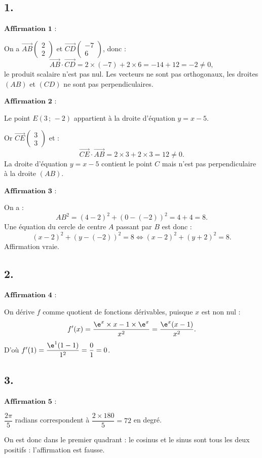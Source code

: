 \subsection*{1.}

\(\textbf{Affirmation 1 :}\)

On a \( \overrightarrow{AB} \begin{pmatrix} 2 \\ 2 \end{pmatrix} \) et \( \overrightarrow{CD} \begin{pmatrix} -7 \\ 6 \end{pmatrix} \), donc :
\[
\overrightarrow{AB} \cdot \overrightarrow{CD} = 2 \times (-7) + 2 \times 6 = -14 + 12 = -2 \neq 0,
\]
le produit scalaire n'est pas nul. Les vecteurs ne sont pas orthogonaux, les droites \((AB)\) et \((CD)\) ne sont pas perpendiculaires.

\(\textbf{Affirmation 2 :}\)

Le point \(E(3 \,;\, -2)\) appartient à la droite d'équation \(y = x - 5\).

Or \( \overrightarrow{CE} \begin{pmatrix} 3 \\ 3 \end{pmatrix} \) et :
\[
\overrightarrow{CE} \cdot \overrightarrow{AB} = 2 \times 3 + 2 \times 3 = 12 \neq 0.
\]
La droite d'équation \(y = x - 5\) contient le point \(C\) mais n'est pas perpendiculaire à la droite \((AB)\).

\(\textbf{Affirmation 3 :}\)

On a :
\[
AB^2 = (4 - 2)^2 + (0 - (-2))^2 = 4 + 4 = 8.
\]
Une équation du cercle de centre \(A\) passant par \(B\) est donc :
\[
(x - 2)^2 + (y - (-2))^2 = 8 \iff (x - 2)^2 + (y + 2)^2 = 8.
\]
Affirmation vraie.

\subsection*{2.}

\(\textbf{Affirmation 4 :}\)

On dérive \(f\) comme quotient de fonctions dérivables, puisque \(x\) est non nul :
\[
f'(x) = \dfrac{\e^x \times x - 1 \times \e^x}{x^2} = \dfrac{\e^x (x - 1)}{x^2}.
\]
D'où \(f'(1) = \dfrac{\e^1 (1 - 1)}{1^2} = \dfrac{0}{1} = 0\).

\subsection*{3.}

\(\textbf{Affirmation 5 :}\)

\(\dfrac{2\pi}{5}\) radians correspondent à \(\dfrac{2 \times 180}{5} = 72\) en degré.

On est donc dans le premier quadrant : le cosinus et le sinus sont tous les deux positifs : l'affirmation est fausse.

